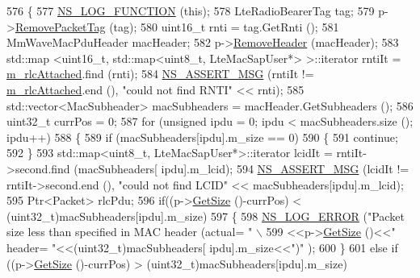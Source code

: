 \begin{DoxyCode}
576 \{
577         \hyperlink{log-macros-disabled_8h_a90b90d5bad1f39cb1b64923ea94c0761}{NS\_LOG\_FUNCTION} (\textcolor{keyword}{this});
578         LteRadioBearerTag tag;
579         p->\hyperlink{classns3_1_1Packet_a078fe922d976a417ab25ba2f3c2fd667}{RemovePacketTag} (tag);
580         uint16\_t rnti = tag.GetRnti ();
581         MmWaveMacPduHeader macHeader;
582         p->\hyperlink{classns3_1_1Packet_a0961eccf975d75f902d40956c93ba63e}{RemoveHeader} (macHeader);
583         std::map <uint16\_t, std::map<uint8\_t, LteMacSapUser*> >::iterator rntiIt = 
      \hyperlink{classns3_1_1MmWaveEnbMac_a13e4bafd30f3edae1f5dc1192c9b3011}{m\_rlcAttached}.find (rnti);
584         \hyperlink{assert_8h_aff5ece9066c74e681e74999856f08539}{NS\_ASSERT\_MSG} (rntiIt != \hyperlink{classns3_1_1MmWaveEnbMac_a13e4bafd30f3edae1f5dc1192c9b3011}{m\_rlcAttached}.end (), \textcolor{stringliteral}{"could not find RNTI"} << 
      rnti);
585         std::vector<MacSubheader> macSubheaders = macHeader.GetSubheaders ();
586         uint32\_t currPos = 0;
587         \textcolor{keywordflow}{for} (\textcolor{keywordtype}{unsigned} ipdu = 0; ipdu < macSubheaders.size (); ipdu++)
588         \{
589                 \textcolor{keywordflow}{if} (macSubheaders[ipdu].m\_size == 0)
590                 \{
591                         \textcolor{keywordflow}{continue};
592                 \}
593                 std::map<uint8\_t, LteMacSapUser*>::iterator lcidIt = rntiIt->second.find (macSubheaders[
      ipdu].m\_lcid);
594                 \hyperlink{assert_8h_aff5ece9066c74e681e74999856f08539}{NS\_ASSERT\_MSG} (lcidIt != rntiIt->second.end (), \textcolor{stringliteral}{"could not find LCID"} << 
      macSubheaders[ipdu].m\_lcid);
595                 Ptr<Packet> rlcPdu;
596                 \textcolor{keywordflow}{if}((p->\hyperlink{classns3_1_1Packet_a462855c9929954d4301a4edfe55f4f1c}{GetSize} ()-currPos) < (uint32\_t)macSubheaders[ipdu].m\_size)
597                         \{
598                                 \hyperlink{group__logging_ga0261a8db1d4ac5f79417d117634fd455}{NS\_LOG\_ERROR} (\textcolor{stringliteral}{"Packet size less than specified in MAC header
       (actual= "} \(\backslash\)
599                                               <<p->\hyperlink{classns3_1_1Packet_a462855c9929954d4301a4edfe55f4f1c}{GetSize} ()<<\textcolor{stringliteral}{" header= "}<<(uint32\_t)macSubheaders[
      ipdu].m\_size<<\textcolor{stringliteral}{")"} );
600                         \}
601                         \textcolor{keywordflow}{else} \textcolor{keywordflow}{if} ((p->\hyperlink{classns3_1_1Packet_a462855c9929954d4301a4edfe55f4f1c}{GetSize} ()-currPos) > (uint32\_t)macSubheaders[ipdu].m\_size)

\end{DoxyCode}
